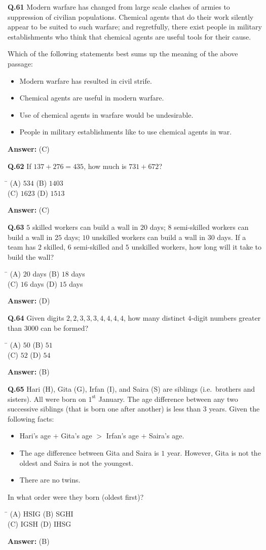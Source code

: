 \documentclass[11pt,a4paper]{article}
\newcommand{\optsfourA}[4]{%
  \begin{tabbing}
    \hspace{0.48\linewidth}\=\kill
    (A) #1 \> (B) #2 \\[2pt]
    (C) #3 \> (D) #4
  \end{tabbing}%
}
\newcommand{\optslistA}[4]{%
  \begin{itemize}
    \setlength{\itemsep}{2pt}\setlength{\parskip}{0pt}
    \item[(A)] #1
    \item[(B)] #2
    \item[(C)] #3
    \item[(D)] #4
  \end{itemize}%
}
\newcommand{\ans}[1]{\textbf{Answer:} #1\par\medskip}
\begin{document}
\textbf{Q.61} Modern warfare has changed from large scale clashes of armies to suppression of civilian populations. Chemical agents that do their work silently appear to be suited to such warfare; and regretfully, there exist people in military establishments who think that chemical agents are useful tools for their cause.

Which of the following statements best sums up the meaning of the above passage:
\optslistA{Modern warfare has resulted in civil strife.}{Chemical agents are useful in modern warfare.}{Use of chemical agents in warfare would be undesirable.}{People in military establishments like to use chemical agents in war.}
\ans{(C)}

\textbf{Q.62} If $137 + 276 = 435$, how much is $731 + 672$?
\optsfourA{$534$}{$1403$}{$1623$}{$1513$}
\ans{(C)}

\textbf{Q.63} $5$ skilled workers can build a wall in $20$ days; $8$ semi-skilled workers can build a wall in $25$ days; $10$ unskilled workers can build a wall in $30$ days. If a team has $2$ skilled, $6$ semi-skilled and $5$ unskilled workers, how long will it take to build the wall?
\optsfourA{$20$ days}{$18$ days}{$16$ days}{$15$ days}
\ans{(D)}

\textbf{Q.64} Given digits $2, 2, 3, 3, 3, 4, 4, 4, 4$, how many distinct $4$-digit numbers greater than $3000$ can be formed?
\optsfourA{$50$}{$51$}{$52$}{$54$}
\ans{(B)}

\textbf{Q.65} Hari (H), Gita (G), Irfan (I), and Saira (S) are siblings (i.e.\ brothers and sisters). All were born on $1^{\text{st}}$ January. The age difference between any two successive siblings (that is born one after another) is less than $3$ years. Given the following facts:
\begin{itemize}
  \setlength{\itemsep}{2pt}\setlength{\parskip}{0pt}
  \item[i.] Hari's age $+$ Gita's age $>$ Irfan's age $+$ Saira's age.
  \item[ii.] The age difference between Gita and Saira is $1$ year. However, Gita is not the oldest and Saira is not the youngest.
  \item[iii.] There are no twins.
\end{itemize}
In what order were they born (oldest first)?
\optsfourA{HSIG}{SGHI}{IGSH}{IHSG}
\ans{(B)}

\newpage

\end{document}
